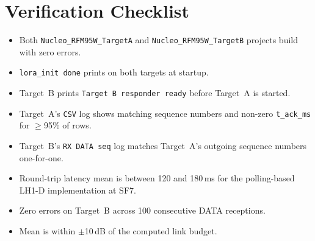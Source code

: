 \documentclass[11pt,letterpaper]{article}
\begin{document}
\newpage
\section{Verification Checklist}
\begin{itemize}[leftmargin=2em]
	\item[$\square$] Both \texttt{Nucleo\_RFM95W\_TargetA} and \texttt{Nucleo\_RFM95W\_TargetB} projects build with zero errors.
	\item[$\square$] \texttt{lora\_init done} prints on both targets at startup.
	\item[$\square$] Target~B prints \texttt{Target B responder ready} before Target~A is started.
	\item[$\square$] Target~A's \texttt{CSV} log shows matching sequence numbers and non-zero \texttt{t\_ack\_ms} for $\geq$95\% of rows.
	\item[$\square$] Target~B's \texttt{RX DATA seq} log matches Target~A's outgoing sequence numbers one-for-one.
    \item[$\square$] Round-trip latency mean is between 120 and 180\,ms for the polling-based LH1-D implementation at SF7.
	\item[$\square$] Zero \CRC{} errors on Target~B across 100 consecutive DATA receptions.
	\item[$\square$] Mean \RSSI{} is within $\pm$10\,dB of the computed link budget.
\end{itemize}
\end{document}
